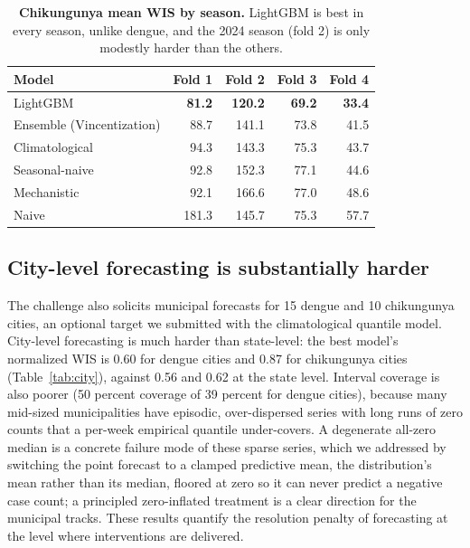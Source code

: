\documentclass[11pt]{article}
\begin{document}
\begin{table}[t]
\centering\small
\caption{\textbf{Chikungunya mean WIS by season.} LightGBM is best in every season, unlike dengue, and
the 2024 season (fold 2) is only modestly harder than the others.}
\label{tab:chikfold}
\begin{tabular}{@{}lrrrr@{}}
\toprule
\textbf{Model} & \textbf{Fold 1} & \textbf{Fold 2} & \textbf{Fold 3} & \textbf{Fold 4} \\
\midrule
LightGBM                  & \textbf{81.2} & \textbf{120.2} & \textbf{69.2} & \textbf{33.4} \\
Ensemble (Vincentization) & 88.7 & 141.1 & 73.8 & 41.5 \\
Climatological            & 94.3 & 143.3 & 75.3 & 43.7 \\
Seasonal-naive            & 92.8 & 152.3 & 77.1 & 44.6 \\
Mechanistic               & 92.1 & 166.6 & 77.0 & 48.6 \\
Naive                     & 181.3 & 145.7 & 75.3 & 57.7 \\
\bottomrule
\end{tabular}
\end{table}

\subsection{City-level forecasting is substantially harder}\label{sec:city}
The challenge also solicits municipal forecasts for 15 dengue and 10 chikungunya cities, an optional
target we submitted with the climatological quantile model. City-level forecasting is much harder than
state-level: the best model's normalized WIS is 0.60 for dengue cities and 0.87 for chikungunya cities
(Table~\ref{tab:city}), against 0.56 and 0.62 at the state level. Interval coverage is also poorer (50
percent coverage of 39 percent for dengue cities), because many mid-sized municipalities have episodic,
over-dispersed series with long runs of zero counts that a per-week empirical quantile under-covers. A
degenerate all-zero median is a concrete failure mode of these sparse series, which we addressed by
switching the point forecast to a clamped predictive mean, the distribution's mean rather than its
median, floored at zero so it can never predict a negative case count; a principled zero-inflated
treatment is a
clear direction for the municipal tracks. These results quantify the resolution penalty of forecasting
at the level where interventions are delivered.
\end{document}
